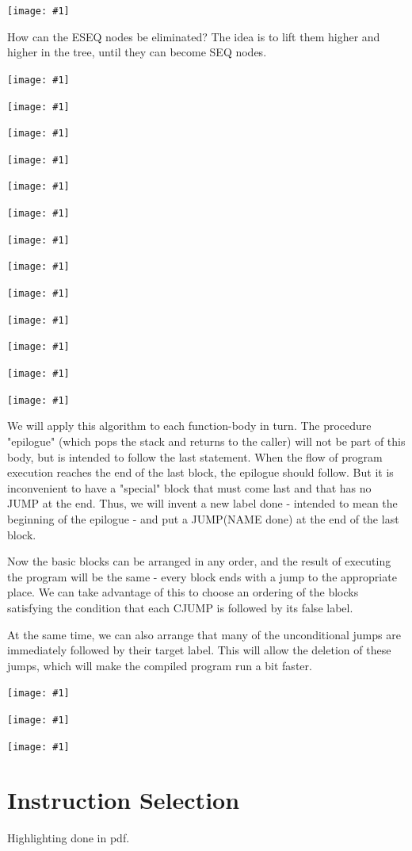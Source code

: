 \documentclass[8pt, a4paper, oneside, twocolumn]{extarticle}
\newcommand{\ph}[1]{
    \texttt{[image: \#1]}
}
\begin{document}
\ph{82}

How can the ESEQ nodes be eliminated? The idea is to lift them higher and
higher in the tree, until they can become SEQ nodes.

\ph{83}

\ph{84}

\ph{85}

\ph{86}

\ph{87}

\ph{88}

\ph{89}

\ph{811}

\ph{812}

\ph{813}

\ph{814}

\ph{815}

\ph{816}

We will apply this algorithm to each function-body in turn. The procedure
"epilogue" (which pops the stack and returns to the caller) will not be part of
this body, but is intended to follow the last statement. When the flow of 
program execution reaches the end of the last block, the epilogue should follow.
But it is inconvenient to have a "special" block that must come last and that
has no JUMP at the end. Thus, we will invent a new label done - intended
to mean the beginning of the epilogue - and put a JUMP(NAME done) at the
end of the last block.

Now the basic blocks can be arranged in any order, and the result of executing
the program will be the same - every block ends with a jump to the 
appropriate place. We can take advantage of this to choose an ordering of the blocks
satisfying the condition that each CJUMP is followed by its false label.

At the same time, we can also arrange that many of the unconditional
jumps are immediately followed by their target label. This will allow the
deletion of these jumps, which will make the compiled program run a bit
faster.

\ph{818}

\ph{819}

\ph{820}

\section{Instruction Selection}
Highlighting done in pdf.
\end{document}
